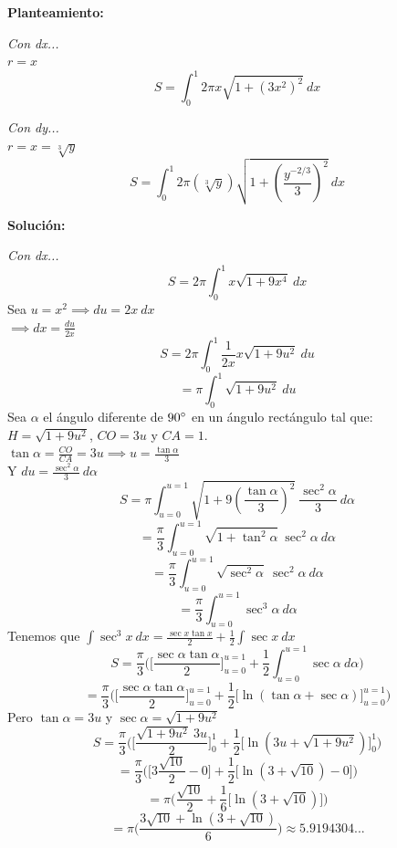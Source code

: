 \documentclass[10pt,letterpaper]{article}
\begin{document}
\begin{enumerate}
\begin{multicols}{2}

\textbf{Planteamiento:}

\textit{Con dx...} \\
$r = x$
$$S = \int_{0}^{1} 2\pi x \sqrt{1+ (3x^2)^2 }\ dx$$

\textit{Con dy...} \\
$r = x = \sqrt[3]{y}$
$$S = \int_{0}^{1} 2\pi (\sqrt[3]{y}) \sqrt{1+ (\frac{y^{-2/3}}{3})^2 }\ dx$$

\textbf{Solución:}

\textit{Con dx...}
$$S = 2\pi \int_{0}^{1} x \sqrt{1+ 9x^4 }\ dx$$
Sea $u=x^2 \implies du = 2x\ dx$\\
$\implies dx = \frac{du}{2x}$
$$S = 2\pi \int_{0}^{1} \frac{1}{2x} x \sqrt{1+ 9u^2 }\ du$$
$$= \pi \int_{0}^{1} \sqrt{1+ 9u^2 }\ du$$
Sea $\alpha$ el ángulo diferente de $90\degree$ en un ángulo rectángulo tal que:\\
$H = \sqrt{1+9u^2}$, $CO = 3u$ y $CA = 1$.\\
$\tan \alpha = \frac{CO}{CA} = 3u \implies u = \frac{\tan \alpha}{3}$\\
Y $du = \frac{\sec^2\alpha}{3}\ d\alpha$
$$S = \pi \int_{u=0}^{u=1} \sqrt{1+ 9(\frac{\tan \alpha}{3})^2 }\ \frac{\sec^2\alpha}{3}\ d\alpha$$
$$= \frac{\pi}{3} \int_{u=0}^{u=1} \sqrt{1+ \tan^2 \alpha }\ \sec^2\alpha\ d\alpha$$
$$= \frac{\pi}{3} \int_{u=0}^{u=1} \sqrt{\sec^2\alpha}\ \sec^2\alpha\ d\alpha$$
$$= \frac{\pi}{3} \int_{u=0}^{u=1} \sec^3 \alpha\ d\alpha$$
Tenemos que $\int \sec^3x\ dx = \frac{\sec x \tan x}{2} + \frac{1}{2} \int \sec x\ dx$
$$S = \frac{\pi}{3} \bigg(
\Big[ \frac{\sec \alpha \tan \alpha}{2} \Big]_{u=0}^{u=1}
+ \frac{1}{2} \int_{u=0}^{u=1} \sec \alpha\ d\alpha \bigg)$$
$$= \frac{\pi}{3} \bigg(
\Big[ \frac{\sec \alpha \tan \alpha}{2} \Big]_{u=0}^{u=1}
+ \frac{1}{2} \Big[ \ln{(\tan \alpha+\sec \alpha)} \Big]_{u=0}^{u=1} \bigg)$$
Pero $\tan\alpha = 3u$ y $\sec\alpha = \sqrt{1+9u^2}$
$$S = \frac{\pi}{3} \bigg(
\Big[ \frac{\sqrt{1+9u^2}\ 3u}{2} \Big]_{0}^{1}
+ \frac{1}{2} \Big[ \ln{(3u+\sqrt{1+9u^2})} \Big]_{0}^{1} \bigg)$$
$$= \frac{\pi}{3} \bigg(
\Big[ 3\frac{ \sqrt{10} }{2} - 0 \Big]
+ \frac{1}{2} \Big[ \ln{(3+\sqrt{10})} - 0 \Big] \bigg)$$
$$= \pi \bigg( \frac{ \sqrt{10} }{2}
+ \frac{1}{6} \Big[ \ln{(3+\sqrt{10})} \Big] \bigg)$$
$$= \pi \bigg( \frac{ 3\sqrt{10} + \ln{ (3+\sqrt{10}) }}{6} \bigg)
\approx 5.9194304... $$

\end{multicols}

\end{enumerate}
\end{document}
